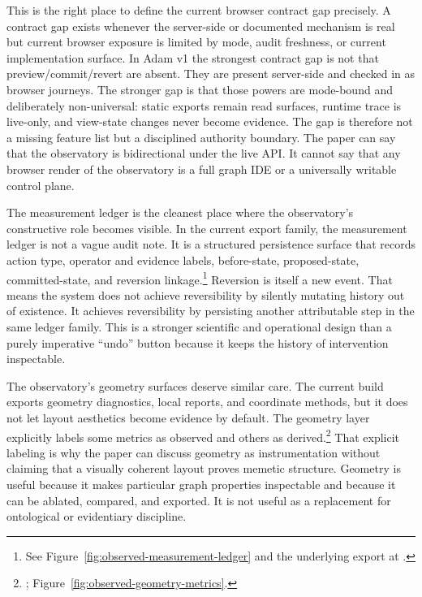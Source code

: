\documentclass[10pt]{article}
\begin{document}
This is the right place to define the current browser contract gap precisely. A contract gap exists whenever the server-side or documented mechanism is real but current browser exposure is limited by mode, audit freshness, or current implementation surface. In Adam v1 the strongest contract gap is not that preview/commit/revert are absent. They are present server-side and checked in as browser journeys. The stronger gap is that those powers are mode-bound and deliberately non-universal: static exports remain read surfaces, runtime trace is live-only, and view-state changes never become evidence. The gap is therefore not a missing feature list but a disciplined authority boundary. The paper can say that the observatory is bidirectional under the live API. It cannot say that any browser render of the observatory is a full graph IDE or a universally writable control plane.

The measurement ledger is the cleanest place where the observatory's constructive role becomes visible. In the current export family, the measurement ledger is not a vague audit note. It is a structured persistence surface that records action type, operator and evidence labels, before-state, proposed-state, committed-state, and reversion linkage.\footnote{See Figure~\ref{fig:observed-measurement-ledger} and the underlying export at .} Reversion is itself a new event. That means the system does not achieve reversibility by silently mutating history out of existence. It achieves reversibility by persisting another attributable step in the same ledger family. This is a stronger scientific and operational design than a purely imperative ``undo'' button because it keeps the history of intervention inspectable.

The observatory's geometry surfaces deserve similar care. The current build exports geometry diagnostics, local reports, and coordinate methods, but it does not let layout aesthetics become evidence by default. The geometry layer explicitly labels some metrics as observed and others as derived.\footnote{; Figure~\ref{fig:observed-geometry-metrics}.} That explicit labeling is why the paper can discuss geometry as instrumentation without claiming that a visually coherent layout proves memetic structure. Geometry is useful because it makes particular graph properties inspectable and because it can be ablated, compared, and exported. It is not useful as a replacement for ontological or evidentiary discipline.
\end{document}

